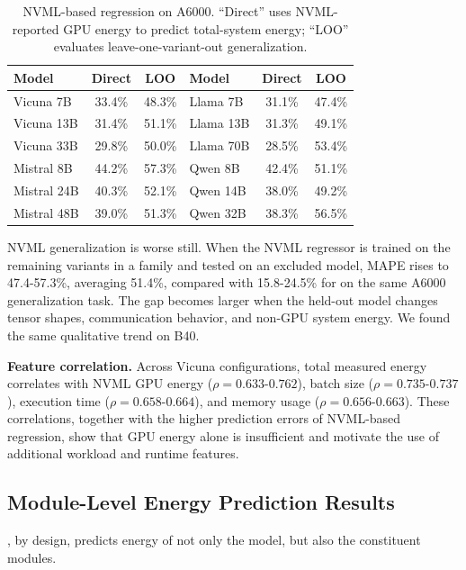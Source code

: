 \begin{table}[t]
\centering
\small
\setlength{\tabcolsep}{2.5pt}
\renewcommand{\arraystretch}{1.05}
\begin{tabular}{@{}lcc|lcc@{}}
\toprule
\textbf{Model} & \textbf{Direct} & \textbf{LOO} & \textbf{Model} & \textbf{Direct} & \textbf{LOO} \\
\midrule
\rowcolor{rowblue} Vicuna 7B & 33.4\% & 48.3\% & Llama 7B & 31.1\% & 47.4\% \\
Vicuna 13B & 31.4\% & 51.1\% & Llama 13B & 31.3\% & 49.1\% \\
\rowcolor{rowblue} Vicuna 33B & 29.8\% & 50.0\% & Llama 70B & 28.5\% & 53.4\% \\
Mistral 8B & 44.2\% & 57.3\% & Qwen 8B & 42.4\% & 51.1\% \\
\rowcolor{rowblue} Mistral 24B & 40.3\% & 52.1\% & Qwen 14B & 38.0\% & 49.2\% \\
Mistral 48B & 39.0\% & 51.3\% & Qwen 32B & 38.3\% & 56.5\% \\
\bottomrule
\end{tabular}
\vspace{5pt}
\caption{NVML-based regression on A6000. ``Direct'' uses NVML-reported GPU energy to predict total-system energy; ``LOO'' evaluates leave-one-variant-out generalization.}
\label{tab:nvml_proxy_combined}
\vspace{-5pt}
\end{table}

NVML generalization is worse still. When the NVML regressor is trained on the remaining variants in a family and tested on an excluded model, MAPE rises to 47.4-57.3\%, averaging 51.4\%, compared with 15.8-24.5\% for \sys{} on the same A6000 generalization task. The gap becomes larger when the held-out model changes tensor shapes, communication behavior, and non-GPU system energy. We found the same qualitative trend on B40.

\smallskip\noindent\textbf{Feature correlation.} Across Vicuna configurations, total measured energy correlates with NVML GPU energy ($\rho=0.633$-$0.762$), batch size ($\rho=0.735$-$0.737$), execution time ($\rho=0.658$-$0.664$), and memory usage ($\rho=0.656$-$0.663$). These correlations, together with the higher prediction errors of NVML-based regression, show that GPU energy alone is insufficient and motivate the use of additional workload and runtime features.

\subsection{Module-Level Energy Prediction Results}
\sys{}, by design, predicts energy of not only the model, but also the constituent modules.

